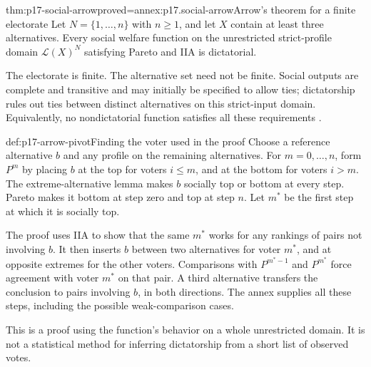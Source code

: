 \begin{hbtheorem}{thm:p17-social-arrow}{proved=annex:p17.social-arrow}{Arrow's theorem for a finite electorate}
Let \(N=\{1,\ldots,n\}\) with \(n\geq1\), and let \(X\) contain at
least three alternatives. Every social welfare function on the unrestricted
strict-profile domain \(\mathcal L(X)^N\) satisfying Pareto and IIA is
dictatorial.

The electorate is finite. The alternative set need not be finite.
Social outputs are complete and transitive and may initially be specified
to allow ties; dictatorship rules out ties between distinct alternatives
on this strict-input domain. Equivalently, no nondictatorial function
satisfies all these requirements
\cite[pp.~125--126]{Rubinstein2015LectureNotes}.
\end{hbtheorem}

\begin{hbmethod}{def:p17-arrow-pivot}{Finding the voter used in the proof}
Choose a reference alternative \(b\) and any profile on the remaining
alternatives. For \(m=0,\ldots,n\), form \(P^m\) by placing \(b\) at
the top for voters \(i\leq m\), and at the bottom for voters \(i>m\).
The extreme-alternative lemma makes \(b\) socially top or bottom at
every step. Pareto makes it bottom at step zero and top at step \(n\).
Let \(m^*\) be the first step at which it is socially top.

The proof uses IIA to show that the same \(m^*\) works for any rankings
of pairs not involving \(b\). It then inserts \(b\) between two alternatives
for voter \(m^*\), and at opposite extremes for the other voters.
Comparisons with \(P^{m^*-1}\) and \(P^{m^*}\) force agreement with
voter \(m^*\) on that pair. A third alternative transfers the conclusion
to pairs involving \(b\), in both directions. The annex supplies all
these steps, including the possible weak-comparison cases.

This is a proof using the function's behavior on a whole unrestricted
domain. It is not a statistical method for inferring dictatorship from
a short list of observed votes.
\end{hbmethod}

